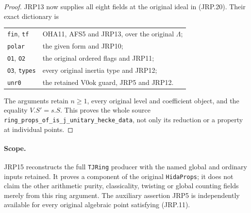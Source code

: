 \documentclass[11pt,a4paper]{article}
\numberwithin{equation}{section}
\theoremstyle{remark}\newtheorem{remark}[theorem]{Remark}
\begin{document}
\begin{proof}
JRP13 now supplies all eight fields at the original ideal in
(JRP.20).  Their exact dictionary is
\begin{center}
\begin{tabular}{ll}
\texttt{fin}, \texttt{tf} & OHA11, AFS5 and JRP13, over the original \(\Lambda\);\\
\texttt{polar} & the given form and JRP10;\\
\texttt{O1}, \texttt{O2} & the original ordered flags and JRP11;\\
\texttt{O3}, \texttt{types} & every original inertia type and JRP12;\\
\texttt{unr0} & the retained \(\mathrm{V0ok}\) guard, JRP5 and JRP12.
\end{tabular}
\end{center}
The arguments retain \(n\ge1\), every original level and
coefficient object, and the equality \(V.S'=s.S\).
This proves the whole source
\texttt{ring\_\allowbreak props\_\allowbreak of\_\allowbreak is\_\allowbreak j\_\allowbreak unitary\_\allowbreak hecke\_\allowbreak data},
not only its reduction or a property at individual points.
\end{proof}

\paragraph{Scope.}
JRP15 reconstructs the full \texttt{TJRing} producer with the named
global and ordinary inputs retained.  It proves a component of the
original \texttt{Hida\allowbreak Props}; it does not claim the other arithmetic
purity, classicality, twisting or global counting fields merely from
this ring argument.  The auxiliary assertion JRP5 is independently
available for every original algebraic point satisfying (JRP.11).

\endgroup
\end{document}
